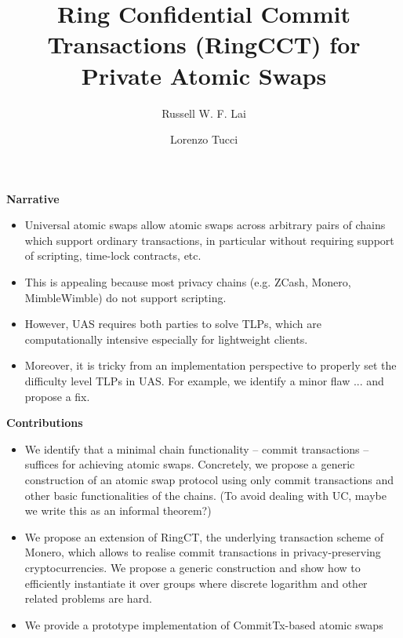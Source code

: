 \documentclass{article}      	%
\begin{document}
         
\author{Russell W. F. Lai \and Lorenzo Tucci}
\title{Ring Confidential Commit Transactions (RingCCT) for Private Atomic Swaps}

\maketitle

\tableofcontents
\newpage


\begin{todobox}
\textbf{Narrative}
\begin{itemize}
\item Universal atomic swaps allow atomic swaps across arbitrary pairs of chains which support ordinary transactions, in particular without requiring support of scripting, time-lock contracts, etc.
\item This is appealing because most privacy chains (e.g. ZCash, Monero, MimbleWimble) do not support scripting.
\item However, UAS requires both parties to solve TLPs, which are computationally intensive especially for lightweight clients.
\item Moreover, it is tricky from an implementation perspective to properly set the difficulty level TLPs in UAS. For example, we identify a minor flaw ... and propose a fix.
\end{itemize}

\textbf{Contributions}
\begin{itemize}
\item We identify that a minimal chain functionality -- commit transactions -- suffices for achieving atomic swaps. Concretely, we propose a generic construction of an atomic swap protocol using only commit transactions and other basic functionalities of the chains. (To avoid dealing with UC, maybe we write this as an informal theorem?)
\item We propose an extension of RingCT, the underlying transaction scheme of Monero, which allows to realise commit transactions in privacy-preserving cryptocurrencies. We propose a generic construction and show how to efficiently instantiate it over groups where discrete logarithm and other related problems are hard. 
\item We provide a prototype implementation of CommitTx-based atomic swaps
\end{itemize}
\end{todobox}










\end{document}
